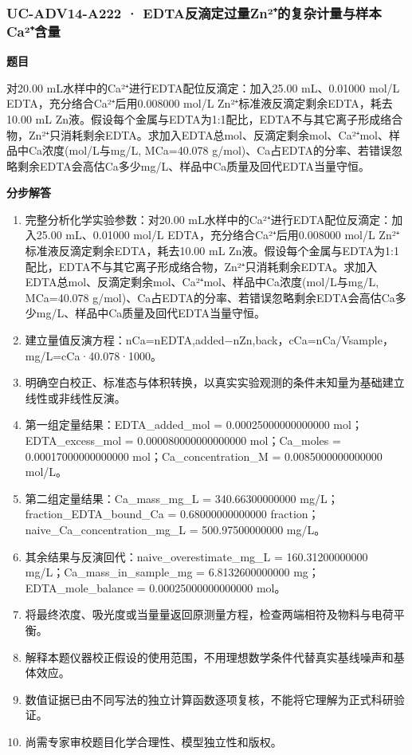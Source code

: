 \documentclass[UTF8,11pt,a4paper]{ctexart}
\begin{document}
\subsubsection*{UC-ADV14-A222 · EDTA反滴定过量Zn²⁺的复杂计量与样本Ca²⁺含量}
\noindent\textbf{题目}\par
对20.00 mL水样中的Ca²⁺进行EDTA配位反滴定：加入25.00 mL、0.01000 mol/L EDTA，充分络合Ca²⁺后用0.008000 mol/L Zn²⁺标准液反滴定剩余EDTA，耗去10.00 mL Zn液。假设每个金属与EDTA为1:1配比，EDTA不与其它离子形成络合物，Zn²⁺只消耗剩余EDTA。求加入EDTA总mol、反滴定剩余mol、Ca²⁺mol、样品中Ca浓度(mol/L与mg/L, MCa=40.078 g/mol)、Ca占EDTA的分率、若错误忽略剩余EDTA会高估Ca多少mg/L、样品中Ca质量及回代EDTA当量守恒。\par
\medskip\noindent\textbf{分步解答}
\begin{enumerate}
\item 完整分析化学实验参数：对20.00 mL水样中的Ca²⁺进行EDTA配位反滴定：加入25.00 mL、0.01000 mol/L EDTA，充分络合Ca²⁺后用0.008000 mol/L Zn²⁺标准液反滴定剩余EDTA，耗去10.00 mL Zn液。假设每个金属与EDTA为1:1配比，EDTA不与其它离子形成络合物，Zn²⁺只消耗剩余EDTA。求加入EDTA总mol、反滴定剩余mol、Ca²⁺mol、样品中Ca浓度(mol/L与mg/L, MCa=40.078 g/mol)、Ca占EDTA的分率、若错误忽略剩余EDTA会高估Ca多少mg/L、样品中Ca质量及回代EDTA当量守恒。
\item 建立量值反演方程：nCa=nEDTA,added−nZn,back，cCa=nCa/Vsample，mg/L=cCa·40.078·1000。
\item 明确空白校正、标准态与体积转换，以真实实验观测的条件未知量为基础建立线性或非线性反演。
\item 第一组定量结果：EDTA\_added\_mol = 0.00025000000000000 mol；EDTA\_excess\_mol = 0.000080000000000000 mol；Ca\_moles = 0.00017000000000000 mol；Ca\_concentration\_M = 0.0085000000000000 mol/L。
\item 第二组定量结果：Ca\_mass\_mg\_L = 340.66300000000 mg/L；fraction\_EDTA\_bound\_Ca = 0.68000000000000 fraction；naive\_Ca\_concentration\_mg\_L = 500.97500000000 mg/L。
\item 其余结果与反演回代：naive\_overestimate\_mg\_L = 160.31200000000 mg/L；Ca\_mass\_in\_sample\_mg = 6.8132600000000 mg；EDTA\_mole\_balance = 0.00025000000000000 mol。
\item 将最终浓度、吸光度或当量量返回原测量方程，检查两端相符及物料与电荷平衡。
\item 解释本题仪器校正假设的使用范围，不用理想数学条件代替真实基线噪声和基体效应。
\item 数值证据已由不同写法的独立计算函数逐项复核，不能将它理解为正式科研验证。
\item 尚需专家审校题目化学合理性、模型独立性和版权。
\end{enumerate}
\end{document}
